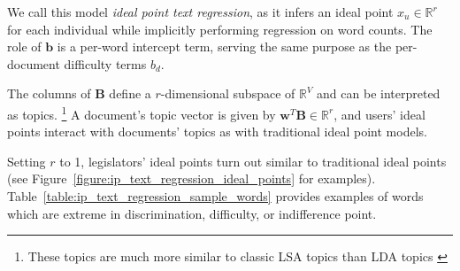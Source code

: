 We call this model \emph{ideal point text regression}, as it infers an
ideal point $x_u \in \mathbb{R}^r$ for each individual while implicitly
performing regression on word counts.  The role of $\bm b$ is a
per-word intercept term, serving the same purpose as the per-document
difficulty terms $b_d$.

The columns of $\bm B$ define a $r$-dimensional subspace of $\mathbb{R}^V$ and
can be interpreted as topics. \footnote{These topics are much more similar to classic LSA
topics than LDA topics \cite{deerwester:1990}} A document's topic vector is given by
$\bm w^T \bm B \in \mathbb{R}^r$, and users' ideal points interact with
documents' topics as with traditional ideal point models.

Setting $r$ to 1, legislators' ideal points turn out similar to
traditional ideal points (see
Figure~\ref{figure:ip_text_regression_ideal_points} for examples).
Table~\ref{table:ip_text_regression_sample_words} provides examples of
words which are extreme in discrimination, difficulty, or indifference point.
